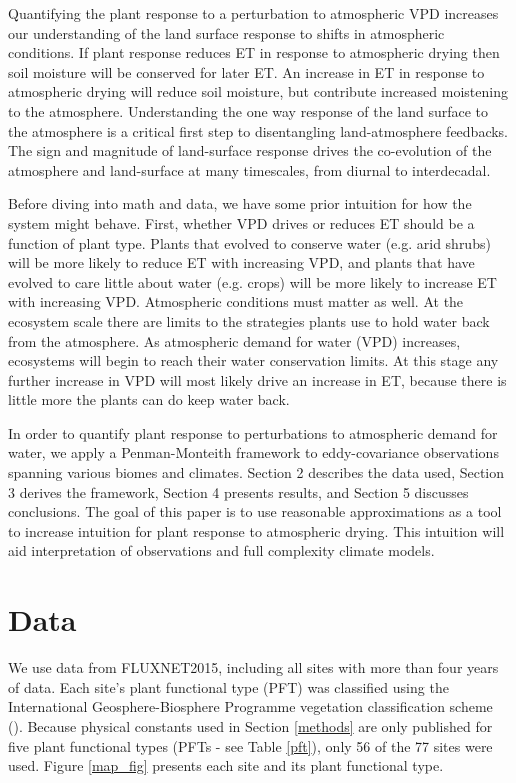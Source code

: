 \documentclass[draft,linenumbers]{agujournal}
\begin{document}
Quantifying the plant response to a perturbation to atmospheric VPD increases our understanding of the land surface response to shifts in atmospheric conditions. If plant response reduces ET in response to atmospheric drying then soil moisture will be conserved for later ET. An increase in ET in response to atmospheric drying will reduce soil moisture, but contribute increased moistening to the atmosphere. Understanding the one way response of the land surface to the atmosphere is a critical first step to disentangling land-atmosphere feedbacks. The sign and magnitude of land-surface response drives the co-evolution of the atmosphere and land-surface at many timescales, from diurnal to interdecadal.

Before diving into math and data, we have some prior intuition for how the system might behave. First, whether VPD drives or reduces ET should be a function of plant type. Plants that evolved to conserve water (e.g. arid shrubs) will be more likely to reduce ET with increasing VPD, and plants that have evolved to care little about water (e.g. crops) will be more likely to increase ET with increasing VPD. Atmospheric conditions must matter as well. At the ecosystem scale there are limits to the strategies plants use to hold water back from the atmosphere. As atmospheric demand for water (VPD) increases, ecosystems will begin to reach their water conservation limits. At this stage any further increase in VPD will most likely drive an increase in ET, because there is little more the plants can do keep water back. 

In order to quantify plant response to perturbations to atmospheric demand for water, we apply a Penman-Monteith framework to eddy-covariance observations spanning various biomes and climates. Section 2 describes the data used, Section 3 derives the framework, Section 4 presents results, and Section 5 discusses conclusions. The goal of this paper is to use reasonable approximations as a tool to increase intuition for plant response to atmospheric drying. This intuition will aid interpretation of observations and full complexity climate models. 

\section{Data}
\label{data}
We use data from FLUXNET2015, including all sites with more than four years of data. Each site's plant functional type (PFT) was classified using the International Geosphere-Biosphere Programme vegetation classification scheme (\cite{Loveland_1999}).  Because physical constants used in Section \ref{methods} are only published for five plant functional types (PFTs - see Table \ref{pft}),  only 56 of the 77 sites were used. Figure \ref{map_fig}  presents each site and its plant functional type.
\end{document}
